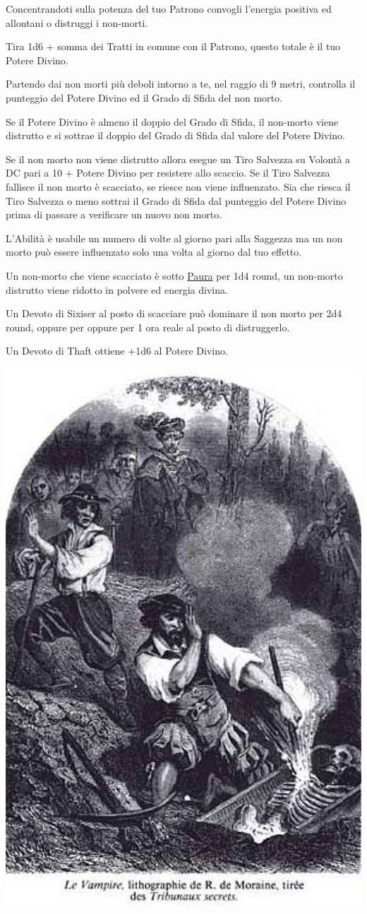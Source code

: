 \begin{multicols}{2}
Concentrandoti sulla potenza del tuo Patrono convogli l'energia positiva ed allontani o distruggi i non-morti.

Tira 1d6 + somma dei Tratti in comune con il Patrono, questo totale è il tuo Potere Divino.

Partendo dai non morti più deboli intorno a te, nel raggio di 9 metri, controlla il punteggio del Potere Divino ed il Grado di Sfida del non morto.

Se il Potere Divino è almeno il doppio del Grado di Sfida, il non-morto viene distrutto e si sottrae il doppio del Grado di Sfida dal valore del Potere Divino.

Se il non morto non viene distrutto allora esegue un Tiro Salvezza su Volontà a DC pari a 10 + Potere Divino per resistere allo scaccio. Se il Tiro Salvezza fallisce il non morto è scacciato, se riesce non viene influenzato. Sia che riesca il Tiro Salvezza o meno sottrai il Grado di Sfida dal punteggio del Potere Divino prima di passare a verificare un nuovo non morto.

L'Abilità è usabile un numero di volte al giorno pari alla Saggezza ma un non morto può essere influenzato solo una volta al giorno dal tuo effetto.

Un non-morto che viene scacciato è sotto \hyperlink{condizionepaura}{Paura} per 1d4 round, un non-morto distrutto viene ridotto in polvere ed energia divina.

Un Devoto di Sixiser al posto di scacciare può dominare il non morto per 2d4 round, oppure per oppure per 1 ora reale al posto di distruggerlo.

Un Devoto di Thaft ottiene +1d6 al Potere Divino.

\begin{center}
	\includegraphics[width=0.6\linewidth]{immagini/turning-undead-six.png}
\end{center}


\end{multicols}
